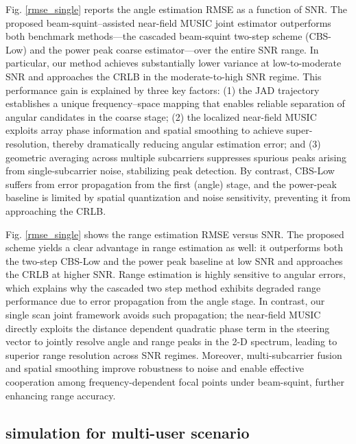 \documentclass[lettersize,journal]{IEEEtran}
\begin{document}
Fig. \ref{rmse_single} reports the angle estimation RMSE as a function of SNR. The proposed beam-squint–assisted near-field MUSIC joint estimator outperforms both benchmark methods—the cascaded beam-squint two-step scheme (CBS-Low) and the power peak coarse estimator—over the entire SNR range. In particular, our method achieves substantially lower variance at low-to-moderate SNR and approaches the CRLB in the moderate-to-high SNR regime. This performance gain is explained by three key factors: (1) the JAD trajectory establishes a unique frequency–space mapping that enables reliable separation of angular candidates in the coarse stage; (2) the localized near-field MUSIC exploits array phase information and spatial smoothing to achieve super-resolution, thereby dramatically reducing angular estimation error; and (3) geometric averaging across multiple subcarriers suppresses spurious peaks arising from single-subcarrier noise, stabilizing peak detection. By contrast, CBS-Low suffers from error propagation from the first (angle) stage, and the power-peak baseline is limited by spatial quantization and noise sensitivity, preventing it from approaching the CRLB.

Fig. \ref{rmse_single}  shows the range estimation RMSE versus SNR. The proposed scheme yields a clear advantage in range estimation as well: it outperforms both the two-step CBS-Low and the power peak baseline at low SNR and approaches the CRLB at higher SNR. Range estimation is highly sensitive to angular errors, which explains why the cascaded two step method exhibits degraded range performance due to error propagation from the angle stage. In contrast, our single scan joint framework avoids such propagation; the near-field MUSIC directly exploits the distance dependent quadratic phase term in the steering vector to jointly resolve angle and range peaks in the 2-D spectrum, leading to superior range resolution across SNR regimes. Moreover, multi-subcarrier fusion and spatial smoothing improve robustness to noise and enable effective cooperation among frequency-dependent focal points under beam-squint, further enhancing range accuracy.

\subsection{simulation for multi-user scenario}
\end{document}
